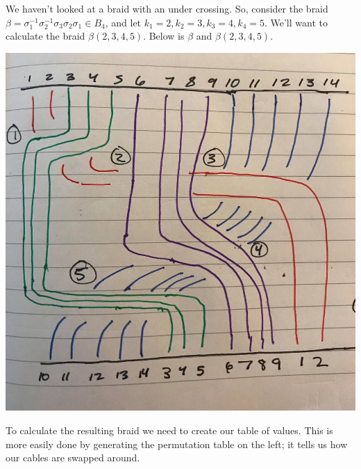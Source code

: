 \begin{example}
    We haven't looked at a braid with an under crossing. So, 
    consider the braid $\beta = \sigma_1^{-1}\sigma_2^{-1}\sigma_3\sigma_2\sigma_1 \in B_4$, 
    and let $k_1 = 2, k_2 = 3, k_3 = 4, k_4 = 5$. We'll want to calculate 
    the braid $\beta(2, 3, 4, 5)$. Below is $\beta$ and $\beta(2,3,4,5)$.
    \begin{center}
    \def\bottomYCoord{5.5}
    \hspace{1cm}
    \raisebox{2cm}{$\mapsto$}
    \hspace{1cm}
    \includegraphics[scale = 0.06]{chp9_operads/inverse_braids.jpg}
    \end{center}
    To calculate the resulting braid we need to create our table of values.
    This is more easily done by generating the permutation table on the left; it 
    tells us how our cables are swapped around. 

\end{example}
